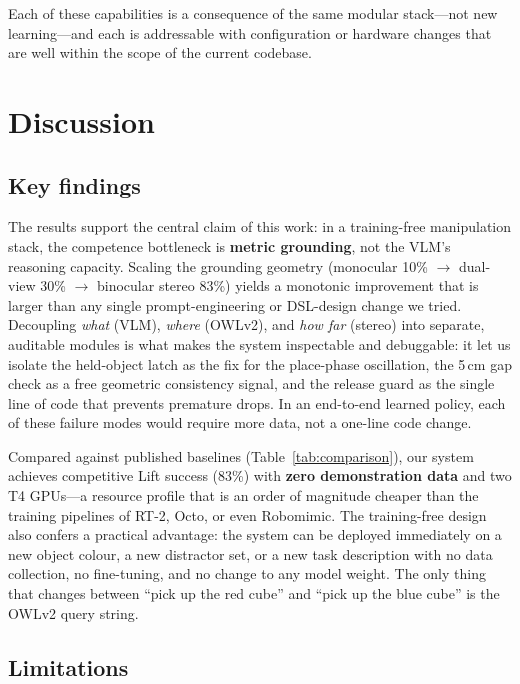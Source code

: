 \documentclass[conference]{IEEEtran}
\begin{document}
Each of these capabilities is a consequence of the same modular stack---not new learning---and each is addressable with configuration or hardware changes that are well within the scope of the current codebase.

\section{Discussion}
\label{sec:discuss}

\subsection{Key findings}

The results support the central claim of this work: in a training-free manipulation stack, the competence bottleneck is \textbf{metric grounding}, not the VLM's reasoning capacity. Scaling the grounding geometry (monocular 10\% $\to$ dual-view 30\% $\to$ binocular stereo 83\%) yields a monotonic improvement that is larger than any single prompt-engineering or DSL-design change we tried. Decoupling \emph{what} (VLM), \emph{where} (OWLv2), and \emph{how far} (stereo) into separate, auditable modules is what makes the system inspectable and debuggable: it let us isolate the held-object latch as the fix for the place-phase oscillation, the 5\,cm gap check as a free geometric consistency signal, and the release guard as the single line of code that prevents premature drops. In an end-to-end learned policy, each of these failure modes would require more data, not a one-line code change.

Compared against published baselines (Table~\ref{tab:comparison}), our system achieves competitive Lift success (83\%) with \textbf{zero demonstration data} and two T4 GPUs---a resource profile that is an order of magnitude cheaper than the training pipelines of RT-2, Octo, or even Robomimic. The training-free design also confers a practical advantage: the system can be deployed immediately on a new object colour, a new distractor set, or a new task description with no data collection, no fine-tuning, and no change to any model weight. The only thing that changes between ``pick up the red cube'' and ``pick up the blue cube'' is the OWLv2 query string.

\subsection{Limitations}
\end{document}
